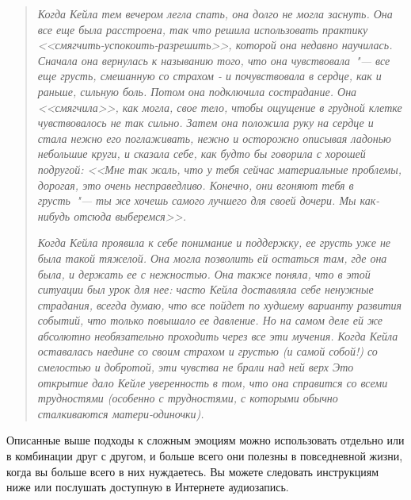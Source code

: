 \begin{quotation}
	\textit{
		Когда Кейла тем вечером легла спать, она долго не могла заснуть. Она все еще была расстроена, так что решила использовать практику <<смягчить-успокоить-разрешить>>, которой она недавно научилась. Сначала она вернулась к называнию того, что она чувствовала~"--- все еще грусть, смешанную со страхом -  и почувствовала в сердце, как и раньше, сильную боль. Потом она подключила сострадание. Она <<смягчила>>, как могла, свое тело, чтобы ощущение в грудной клетке чувствовалось не так сильно. Затем она положила руку на сердце и стала нежно его поглаживать, нежно и осторожно описывая ладонью небольшие круги, и сказала себе, как будто бы говорила с хорошей подругой: <<Мне так жаль, что у тебя сейчас материальные проблемы, дорогая, это очень несправедливо. Конечно, они вгоняют тебя в грусть~"--- ты же хочешь самого лучшего для своей дочери. Мы как-нибудь отсюда выберемся>>.
	}
	
	\textit{
		Когда Кейла проявила к себе понимание и поддержку, ее грусть уже не была такой тяжелой. Она могла позволить ей остаться там, где она была, и держать ее с нежностью. Она также поняла, что в этой ситуации был урок для нее: часто Кейла доставляла себе ненужные страдания, всегда думаю, что все пойдет по худшему варианту развития событий, что только повышало ее давление. Но на самом деле ей же абсолютно необязательно проходить через все эти мучения. Когда Кейла оставалась наедине со своим страхом и грустью (и самой собой!) со смелостью и добротой, эти чувства не брали над ней верх Это открытие дало Кейле уверенность в том, что она справится со всеми трудностями (особенно с трудностями, с которыми обычно сталкиваются матери-одиночки).
	}	
\end{quotation}


\newpage
{} \label{IP:Working_with_Difficult_Emotions}

Описанные выше подходы к сложным эмоциям можно использовать отдельно или в комбинации друг с другом, и больше всего они полезны в повседневной жизни, когда вы больше всего в них нуждаетесь. Вы можете следовать инструкциям ниже или послушать доступную в Интернете аудиозапись.

